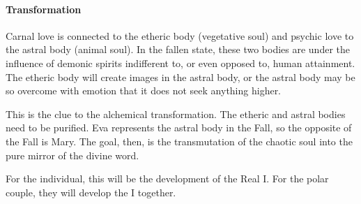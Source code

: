 \paragraph{Transformation}
Carnal love is connected to the etheric body (vegetative soul) and psychic love to the astral body (animal soul). In the fallen state, these two bodies are under the influence of demonic spirits indifferent to, or even opposed to, human attainment. The etheric body will create images in the astral body, or the astral body may be so overcome with emotion that it does not seek anything higher.

This is the clue to the alchemical transformation. The etheric and astral bodies need to be purified. Eva represents the astral body in the Fall, so the opposite of the Fall is Mary. The goal, then, is the transmutation of the chaotic soul into the pure mirror of the divine word.

For the individual, this will be the development of the Real I. For the polar couple, they will develop the I together.



